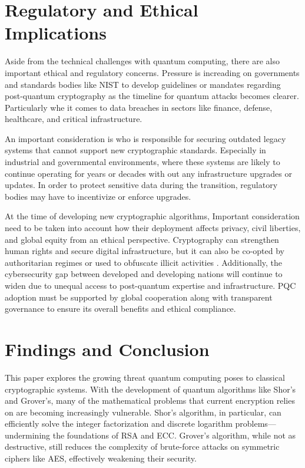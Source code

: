 \documentclass[conference]{IEEEtran}
\begin{document}
\section{Regulatory and Ethical Implications}

Aside from the technical challenges with quantum computing, there are also important ethical and regulatory concerns. Pressure is increading on governments and standards bodies like NIST to develop guidelines or mandates regarding post-quantum cryptography as the timeline for quantum attacks becomes clearer. Particularly whe it comes to data breaches in sectors like finance, defense, healthcare, and critical infrastructure.

An important consideration is who is responsible for securing outdated legacy systems that cannot support new cryptographic standards. Especially in industrial and governmental environments, where these systems are likely to continue operating for years or decades with out any infrastructure upgrades or updates. In order to protect sensitive data during the transition, regulatory bodies may have to incentivize or enforce upgrades.

At the time of developing new cryptographic algorithms, Important consideration need to be taken into account how their deployment affects privacy, civil liberties, and global equity from an ethical perspective. Cryptography can strengthen human rights and secure digital infrastructure, but it can also be co-opted by authoritarian regimes or used to obfuscate illicit activities \cite{vanDaalen2022}. Additionally, the cybersecurity gap between developed and developing nations will continue to widen due to unequal access to post-quantum expertise and infrastructure. PQC adoption must be supported by global cooperation along with transparent governance to ensure its overall benefits and ethical compliance.

\section{Findings and Conclusion}
This paper explores the growing threat quantum computing poses to classical cryptographic systems. With the development of quantum algorithms like Shor’s and Grover’s, many of the mathematical problems that current encryption relies on are becoming increasingly vulnerable. Shor’s algorithm, in particular, can efficiently solve the integer factorization and discrete logarithm problems—undermining the foundations of RSA and ECC. Grover’s algorithm, while not as destructive, still reduces the complexity of brute-force attacks on symmetric ciphers like AES, effectively weakening their security.
\end{document}
